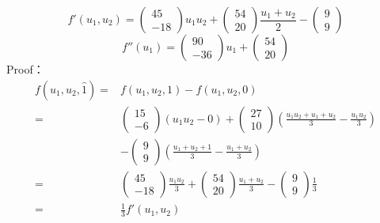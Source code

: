 \documentclass{article}
\begin{document}
$$f'(u_1,u_2)=\left(\begin{array}{c}	45\\-18 \end{array}\right)u_1u_2+
\left(\begin{array}{c}	54\\20 \end{array}\right)\frac{u_1+u_2}{2}-
\left(\begin{array}{c} 9\\9 \end{array}\right)$$
$$f''(u_1)=\left(\begin{array}{c}	90\\-36 \end{array}\right)u_1+
\left(\begin{array}{c}	54\\20 \end{array}\right)$$
Proof：
\begin{equation*}
	\begin{aligned}
		f(u_1,u_2,\hat{1})=&f(u_1,u_2,1)-f(u_1,u_2,0)\\
		=&\left(\begin{array}{c}	15\\-6 \end{array}\right)(u_1u_2-0)+
		\left(\begin{array}{c}	27\\10 \end{array}\right)(\frac{u_1u_2+u_1+u_2}{3}-\frac{u_1u_2}{3})\\
		&-
		\left(\begin{array}{c}	9\\9 \end{array}\right)(\frac{u_1+u_2+1}{3}-\frac{u_1+u_2}{3})\\
		=&\left(\begin{array}{c}	45\\-18 \end{array}\right)\frac{u_1u_2}{3}+\left(\begin{array}{c}	54\\20 \end{array}\right)\frac{u_1+u_2}{3}-\left(\begin{array}{c}	9\\9 \end{array}\right)\frac{1}{3}\\
		=&\frac{1}{3}f'(u_1,u_2)
	\end{aligned}
\end{equation*}
\end{document}

